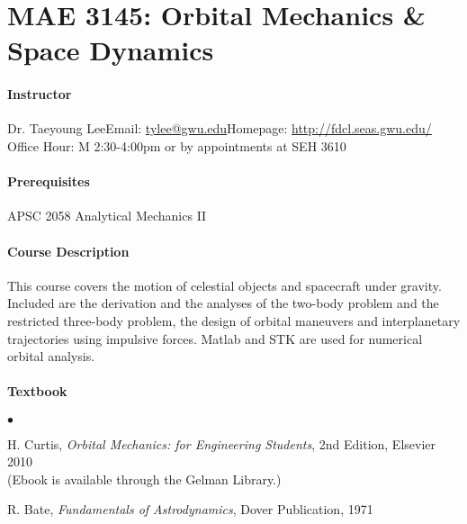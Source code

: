 \documentclass[10pt]{article}
\date{}
\begin{document}
\pagestyle{empty}
\section*{MAE 3145: Orbital Mechanics \& Space Dynamics}
\vspace*{-0.4cm}


\paragraph*{Instructor}
Dr. Taeyoung Lee\quad Email: \url{tylee@gwu.edu}\quad Homepage: \url{http://fdcl.seas.gwu.edu/}\\
\hspace*{1.8cm}
Office Hour: M 2:30-4:00pm or by appointments at SEH 3610


\paragraph*{Prerequisites} APSC 2058 Analytical Mechanics II

\paragraph*{Course Description} This course covers the motion of celestial objects and spacecraft under gravity. Included are the derivation and the analyses of the two-body problem and the restricted three-body problem, the design of orbital maneuvers and interplanetary trajectories using impulsive forces. Matlab and STK are used for numerical orbital analysis.

\paragraph*{Textbook}
\begin{list}{$\bullet$}{\setlength{\itemsep}{-3pt}}\item 
H. Curtis, \textit{Orbital Mechanics: for Engineering Students}, 2nd Edition, Elsevier 2010\\
(Ebook is available through the Gelman Library.)
\item R. Bate, \textit{Fundamentals of Astrodynamics}, Dover Publication, 1971
\end{list}
\end{document}
